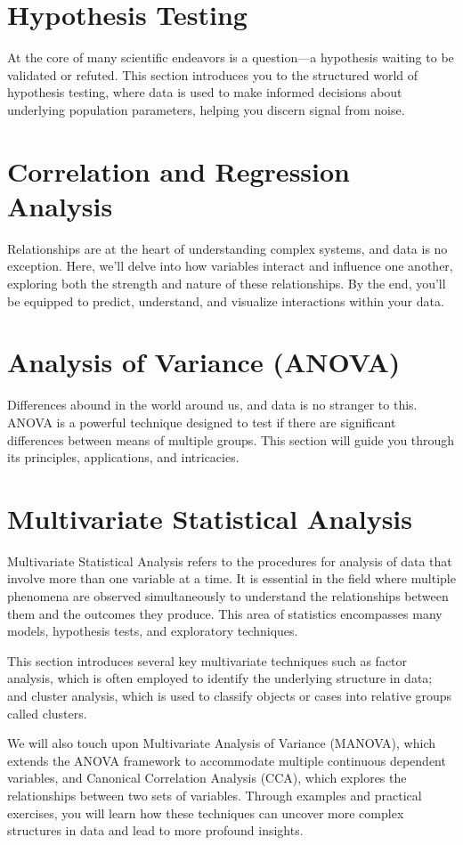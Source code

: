 \documentclass[a4paper,12pt]{book}
\newcounter{example}
\begin{document}
\section{Hypothesis Testing}
At the core of many scientific endeavors is a question—a hypothesis waiting to be validated or refuted. This section introduces you to the structured world of hypothesis testing, where data is used to make informed decisions about underlying population parameters, helping you discern signal from noise.

\section{Correlation and Regression Analysis}
Relationships are at the heart of understanding complex systems, and data is no exception. Here, we'll delve into how variables interact and influence one another, exploring both the strength and nature of these relationships. By the end, you'll be equipped to predict, understand, and visualize interactions within your data.

\section{Analysis of Variance (ANOVA)}
Differences abound in the world around us, and data is no stranger to this. ANOVA is a powerful technique designed to test if there are significant differences between means of multiple groups. This section will guide you through its principles, applications, and intricacies.

\section{Multivariate Statistical Analysis}
Multivariate Statistical Analysis refers to the procedures for analysis of data that involve more than one variable at a time. It is essential in the field where multiple phenomena are observed simultaneously to understand the relationships between them and the outcomes they produce. This area of statistics encompasses many models, hypothesis tests, and exploratory techniques.

This section introduces several key multivariate techniques such as factor analysis, which is often employed to identify the underlying structure in data; and cluster analysis, which is used to classify objects or cases into relative groups called clusters.

We will also touch upon Multivariate Analysis of Variance (MANOVA), which extends the ANOVA framework to accommodate multiple continuous dependent variables, and Canonical Correlation Analysis (CCA), which explores the relationships between two sets of variables. Through examples and practical exercises, you will learn how these techniques can uncover more complex structures in data and lead to more profound insights.
\end{document}
